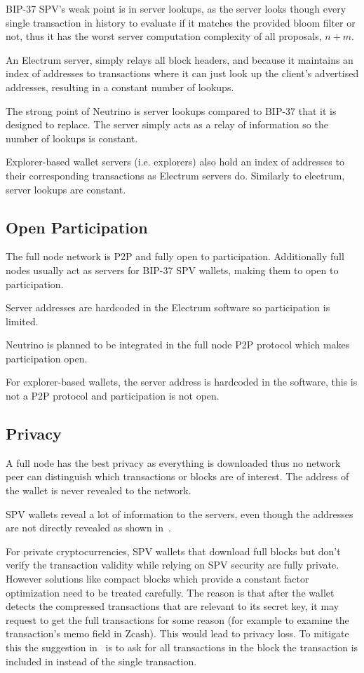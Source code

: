 BIP-37 SPV's weak point is in server lookups, as the server looks though every single transaction in history to evaluate if it matches the provided bloom filter or not, thus it has the worst server computation complexity of all proposals, $n+m$.

An Electrum server, simply relays all block headers, and because it maintains an index of addresses to transactions where it can just look up the client's advertised addresses, resulting in a constant number of lookups.

The strong point of Neutrino is server lookups compared to BIP-37 that it is designed to replace. The server simply acts as a relay of information so the number of lookups is constant.

Explorer-based wallet servers (i.e. explorers) also hold an index of addresses to their corresponding transactions as Electrum servers do. Similarly to electrum, server lookups are constant.

\subsection{Open Participation}
The full node network is P2P and fully open to participation.  Additionally full nodes usually act as servers for BIP-37 SPV wallets, making them to open to participation.

Server addresses are hardcoded in the Electrum software so participation is limited.

Neutrino is planned to be integrated in the full node P2P protocol which makes participation open.

For explorer-based wallets, the server address is hardcoded in the software, this is not a P2P protocol and participation is not open.

\subsection{Privacy}
A full node has the best privacy as everything is downloaded thus no network peer can distinguish which transactions or blocks are of interest. The address of the wallet is never revealed to the network. 

SPV wallets reveal a lot of information to the servers, even though the addresses are not directly revealed as shown in~\cite{gervais2014privacy}.

For private cryptocurrencies, SPV wallets that download full blocks but don't verify the transaction validity while relying on SPV security are fully private. However solutions like compact blocks which provide a constant factor optimization need to be treated carefully. The reason is that after the wallet detects the compressed transactions that are relevant to its secret key, it may request to get the full transactions for some reason (for example to examine the transaction's memo field in Zcash). This would lead to privacy loss. To mitigate this the suggestion in~\cite{compact-blocks} is to ask for all transactions in the block the transaction is included in instead of the single transaction.


